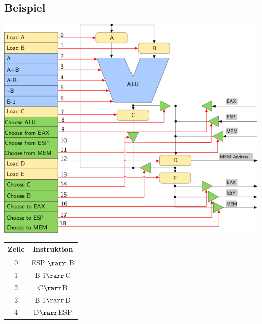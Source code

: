 	\subsection{Beispiel}
		\includegraphics[scale=0.75]{mikroprogrammwerk.png}
		\begin{center}
			\begin{tabular} {|c|c|}
			\hline
			Zeile & Instruktion \\
			\hline
			0 & ESP $\rarr$ B \\
			\hline
			1 & B-1$\rarr$C \\
			\hline
			2 & C$\rarr$B \\
			\hline
			3 & B-1$\rarr$D \\
			\hline
			4 & D$\rarr$ESP \\
			\hline
		\end{tabular}	
		\end{center}
		
				
	